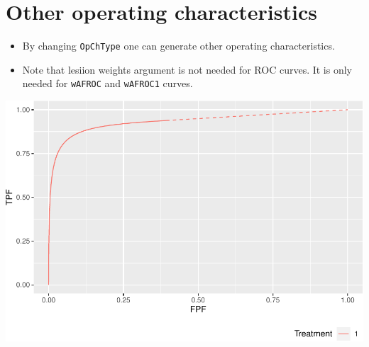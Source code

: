 \documentclass[
]{book}
\newenvironment{Shaded}{\begin{snugshade}}{\end{snugshade}}
\newcommand{\DataTypeTok}[1]{\textcolor[rgb]{0.13,0.29,0.53}{#1}}
\newcommand{\DecValTok}[1]{\textcolor[rgb]{0.00,0.00,0.81}{#1}}
\newcommand{\FloatTok}[1]{\textcolor[rgb]{0.00,0.00,0.81}{#1}}
\newcommand{\KeywordTok}[1]{\textcolor[rgb]{0.13,0.29,0.53}{\textbf{#1}}}
\newcommand{\NormalTok}[1]{#1}
\newcommand{\OperatorTok}[1]{\textcolor[rgb]{0.81,0.36,0.00}{\textbf{#1}}}
\newcommand{\StringTok}[1]{\textcolor[rgb]{0.31,0.60,0.02}{#1}}
\providecommand{\tightlist}{%
  \setlength{\itemsep}{0pt}\setlength{\parskip}{0pt}}
\begin{document}
\hypertarget{other-operating-characteristics}{%
\section{Other operating characteristics}\label{other-operating-characteristics}}

\begin{itemize}
\tightlist
\item
  By changing \texttt{OpChType} one can generate other operating characteristics.
\item
  Note that lesiion weights argument is not needed for ROC curves. It is only needed for \texttt{wAFROC} and \texttt{wAFROC1} curves.
\end{itemize}

\begin{Shaded}
\end{Shaded}

\includegraphics{19-PlotRsmOpCh_files/figure-latex/unnamed-chunk-5-1.pdf}
\end{document}
